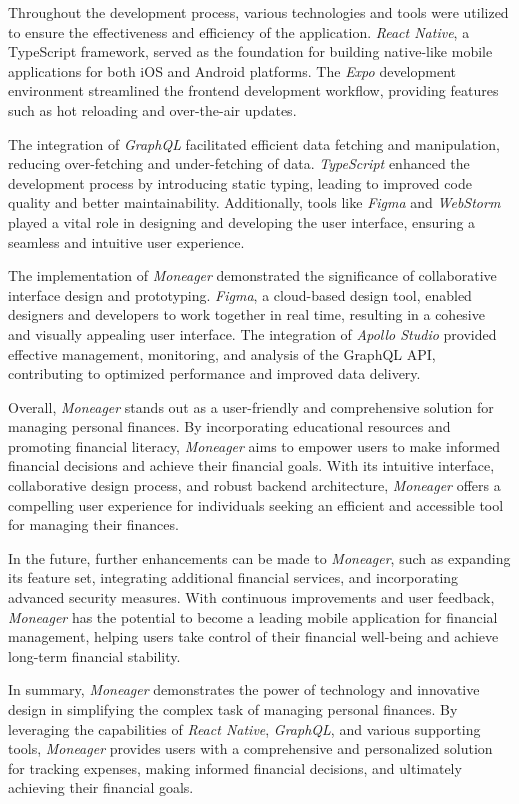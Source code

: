 Throughout the development process, various technologies and tools were utilized to ensure the effectiveness and efficiency of the application. \textit{React Native}, a TypeScript framework, served as the foundation for building native-like mobile applications for both iOS and Android platforms. The \textit{Expo} development environment streamlined the frontend development workflow, providing features such as hot reloading and over-the-air updates.

The integration of \textit{GraphQL} facilitated efficient data fetching and manipulation, reducing over-fetching and under-fetching of data. \textit{TypeScript} enhanced the development process by introducing static typing, leading to improved code quality and better maintainability. Additionally, tools like \textit{Figma} and \textit{WebStorm} played a vital role in designing and developing the user interface, ensuring a seamless and intuitive user experience.

The implementation of \textit{Moneager} demonstrated the significance of collaborative interface design and prototyping. \textit{Figma}, a cloud-based design tool, enabled designers and developers to work together in real time, resulting in a cohesive and visually appealing user interface. The integration of \textit{Apollo Studio} provided effective management, monitoring, and analysis of the GraphQL API, contributing to optimized performance and improved data delivery.

Overall, \textit{Moneager} stands out as a user-friendly and comprehensive solution for managing personal finances. By incorporating educational resources and promoting financial literacy, \textit{Moneager} aims to empower users to make informed financial decisions and achieve their financial goals. With its intuitive interface, collaborative design process, and robust backend architecture, \textit{Moneager} offers a compelling user experience for individuals seeking an efficient and accessible tool for managing their finances.

In the future, further enhancements can be made to \textit{Moneager}, such as expanding its feature set, integrating additional financial services, and incorporating advanced security measures. With continuous improvements and user feedback, \textit{Moneager} has the potential to become a leading mobile application for financial management, helping users take control of their financial well-being and achieve long-term financial stability.

In summary, \textit{Moneager} demonstrates the power of technology and innovative design in simplifying the complex task of managing personal finances. By leveraging the capabilities of \textit{React Native}, \textit{GraphQL}, and various supporting tools, \textit{Moneager} provides users with a comprehensive and personalized solution for tracking expenses, making informed financial decisions, and ultimately achieving their financial goals.
